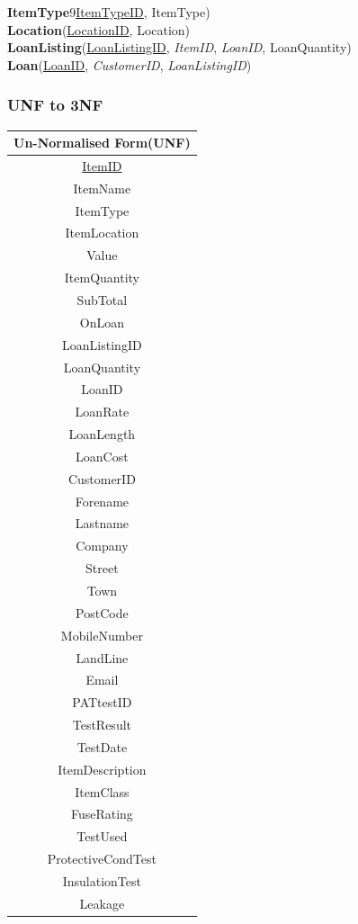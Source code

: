 \noindent \textbf{ItemType}9\underline{ItemTypeID}, ItemType)\\

\noindent \textbf{Location}(\underline{LocationID}, Location)\\

\noindent \textbf{LoanListing}(\underline{LoanListingID}, \emph{ItemID}, \emph{LoanID}, LoanQuantity)\\

\noindent \textbf{Loan}(\underline{LoanID}, \emph{CustomerID}, \emph{LoanListingID})



\subsubsection{UNF to 3NF}

\begin{center}
    \begin{tabular}{|c|}
        \hline
        \textbf{Un-Normalised Form(UNF)}\\ \hline
        \underline{ItemID}\\
        ItemName\\
        ItemType\\
        ItemLocation\\ 
        Value\\ 
        ItemQuantity\\ 
        SubTotal\\ 
        OnLoan\\ 
        LoanListingID\\ 
        LoanQuantity\\
        LoanID\\ 
        LoanRate\\ 
        LoanLength\\ 
        LoanCost\\ 
        CustomerID\\ 
        Forename\\ 
        Lastname\\ 
        Company\\ 
        Street\\ 
        Town\\ 
        PostCode\\ 
        MobileNumber\\ 
        LandLine\\ 
        Email\\ 
        PATtestID\\
        TestResult\\ 
        TestDate\\ 
        ItemDescription\\ 
        ItemClass\\ 
        FuseRating\\ 
        TestUsed\\ 
        ProtectiveCondTest\\ 
        InsulationTest\\ 
        Leakage\\ \hline
    \end{tabular}
\end{center}

